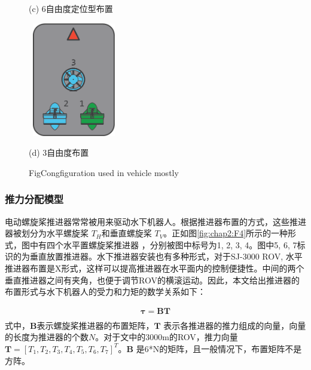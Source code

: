 \begin{figure}
\begin{minipage}{0.48\linewidth}
  \centerline{(c) 6自由度定位型布置}
\end{minipage}
\hfill
\begin{minipage}{0.48\linewidth}
  \centerline{\includegraphics[width=4.0cm,height = 5cm]{figure/chap2/simplerov-3.png}}
  \centerline{(d) 3自由度布置}
\end{minipage}
\label{fig:chap2:F8}
 {Fig}{Congfiguration used in vehicle mostly\cite{ardusub}}
\end{figure}

\subsubsection{推力分配模型 }
电动螺旋桨推进器常常被用来驱动水下机器人。根据推进器布置的方式，这些推进器被划分为水平螺旋桨  $T_H$和垂直螺旋桨 $T_V$。正如图\ref{fig:chap2:F4}所示的一种形式，图中有四个水平置螺旋桨推进器 ，分别被图中标号为1, 2, 3, 4。图中5, 6, 7标识的为垂直放置推进器。水下推进器安装也有多种形式，对于SJ-3000 ROV, 水平推进器布置是X形式，这样可以提高推进器在水平面内的控制便捷性。中间的两个垂直推进器之间有夹角，也便于调节ROV的横滚运动。因此，本文给出推进器的布置形式与水下机器人的受力和力矩的数学关系如下\cite{dos2016bank}：

\begin{equation}
\label{eq:chap2:thrustconfigure_1}
  \begin{array}{l}
   {\bm \tau} = \bm{BT} \\
  \end{array}
\end{equation}
式中，$\bm{B}$表示螺旋桨推进器的布置矩阵，$\bm{T}$ 表示各推进器的推力组成的向量，向量的长度为推进器的个数$N$。对于文中的3000m的ROV，推力向量$\bm{T} = [T_1,T_2,T_3,T_4,T_5,T_6,T_7]^T$。$\bm{B}$ 是6*N的矩阵，且一般情况下，布置矩阵不是方阵。

